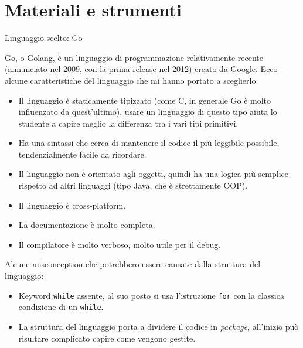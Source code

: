 \section{Materiali e strumenti}
Linguaggio scelto: \href{https://go.dev/}{\underline{Go}}

Go, o Golang, è un linguaggio di programmazione relativamente recente (annunciato nel 2009, con la prima release nel 2012) creato da Google. Ecco alcune caratteristiche del linguaggio che mi hanno portato a sceglierlo:

\begin{itemize}
    \item Il linguaggio è staticamente tipizzato (come C, in generale Go è molto influenzato da quest'ultimo), usare un linguaggio di questo tipo aiuta lo studente a capire meglio la differenza tra i vari tipi primitivi.
    \item Ha una sintassi che cerca di mantenere il codice il più leggibile possibile, tendenzialmente facile da ricordare.
    \item Il linguaggio non è orientato agli oggetti, quindi ha una logica più semplice rispetto ad altri linguaggi (tipo Java, che è strettamente OOP).
    \item Il linguaggio è cross-platform.
    \item La documentazione è molto completa.
    \item Il compilatore è molto verboso, molto utile per il debug.
\end{itemize}

Alcune misconception che potrebbero essere causate dalla struttura del linguaggio:

\begin{itemize}
    \item Keyword \texttt{while} assente, al suo posto si usa l'istruzione \texttt{for} con la classica condizione di un \texttt{while}.
    \item La struttura del linguaggio porta a dividere il codice in \textit{package}, all'inizio può risultare complicato capire come vengono gestite.
\end{itemize}